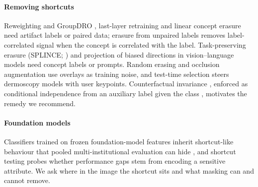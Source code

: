 \documentclass[review,3p]{elsarticle}
\begin{document}
\paragraph{Removing shortcuts} Reweighting and GroupDRO \citep{sagawa2020groupdro}, last-layer retraining
\citep{kirichenko2023dfr} and linear concept erasure \citep{ravfogel2020inlp,belrose2023leace} need artifact labels or
paired data; erasure from unpaired labels removes label-correlated signal when the concept is correlated with the
label. Task-preserving erasure (SPLINCE; \citealp{splice2025}) and projection of biased directions in vision--language
models \citep{chuang2023debiasing} need concept labels or prompts. Random erasing and occlusion augmentation
\citep{zhong2020random,fong2019occlusions} use overlays as training noise, and test-time selection
\citep{bissoto2023tts} steers dermoscopy models with user keypoints. Counterfactual invariance
\citep{veitch2021counterfactual}, enforced as conditional independence from an auxiliary label given the class
\citep{makar2022causally}, motivates the remedy we recommend.
\paragraph{Foundation models} Classifiers trained on frozen foundation-model features inherit shortcut-like
behaviour that pooled multi-institutional evaluation can hide \citep{germani2026aggregation}, and shortcut testing
\citep{brown2023shortcut} probes whether performance gaps stem from encoding a sensitive attribute. We ask where in
the image the shortcut sits and what masking can and cannot remove.


\end{document}
